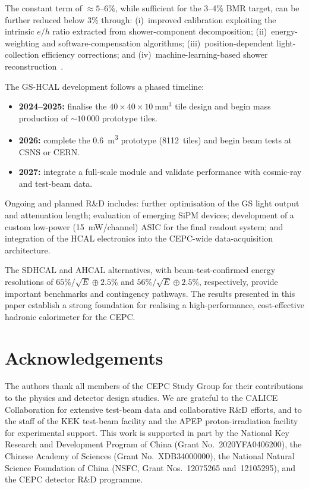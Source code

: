 \documentclass[preprint,12pt,times]{elsarticle}
\newcommand{\cellsize}{\ensuremath{40\times40\times10~\text{mm}^{3}}\xspace}
\begin{document}
The constant term of ${\approx}5$--6\%, while sufficient for the
3--4\% BMR target, can be further reduced below 3\% through:
(i)~improved calibration exploiting the intrinsic $e/h$ ratio extracted
from shower-component decomposition;
(ii)~energy-weighting and software-compensation algorithms;
(iii)~position-dependent light-collection efficiency corrections; and
(iv)~machine-learning-based shower
reconstruction~\cite{Simon:2009bt,Rolph:2022eba,CALICE:2024imr,Liu:2025hgf}.

The GS-HCAL development follows a phased timeline:
\begin{itemize}
\item \textbf{2024--2025:} finalise the \cellsize tile design and begin
  mass production of ${\sim}10\,000$ prototype tiles.
\item \textbf{2026:} complete the \SI{0.6}{m^{3}} prototype (8112~tiles)
  and begin beam tests at CSNS or CERN\@.
\item \textbf{2027:} integrate a full-scale module and validate
  performance with cosmic-ray and test-beam data.
\end{itemize}

Ongoing and planned R\&D includes: further optimisation of the GS light
output and attenuation length; evaluation of emerging SiPM devices;
development of a custom low-power (\SI{15}{mW/channel}) ASIC for the
final readout system; and integration of the HCAL electronics into the
CEPC-wide data-acquisition architecture.

The SDHCAL and AHCAL alternatives, with beam-test-confirmed energy
resolutions of $65\%/\sqrt{E}\oplus2.5\%$ and
$56\%/\sqrt{E}\oplus2.5\%$, respectively, provide important benchmarks
and contingency pathways.
The results presented in this paper establish a strong foundation for
realising a high-performance, cost-effective hadronic calorimeter for the
CEPC\@.

\section*{Acknowledgements}

The authors thank all members of the CEPC Study Group for their
contributions to the physics and detector design studies.
We are grateful to the CALICE Collaboration for extensive test-beam data
and collaborative R\&D efforts, and to the staff of the KEK test-beam
facility and the APEP proton-irradiation facility for experimental
support.
This work is supported in part by
the National Key Research and Development Program of China
(Grant No.~2020YFA0406200),
the Chinese Academy of Sciences (Grant No.~XDB34000000),
the National Natural Science Foundation of China (NSFC,
Grant Nos.~12075265 and~12105295),
and the CEPC detector R\&D programme.


\end{document}
